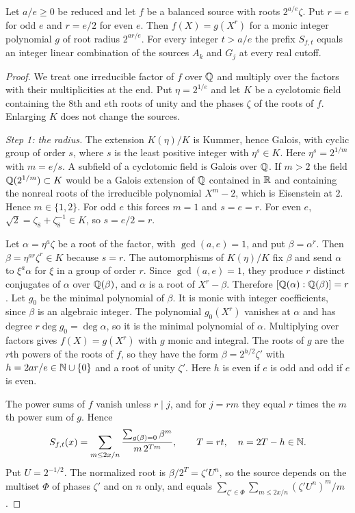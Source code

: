 \documentclass[11pt]{article}
\begin{document}
\begin{theorem}\label{th:balanced}
Let $a/e\ge0$ be reduced and let $f$ be a balanced source with roots $2^{a/e}\zeta$. Put $r=e$ for odd $e$ and $r=e/2$ for even $e$. Then $f(X)=g(X^r)$ for a monic integer polynomial $g$ of root radius $2^{ar/e}$. For every integer $t>a/e$ the prefix $S_{f,t}$ equals an integer linear combination of the sources $A_k$ and $G_j$ at every real cutoff.
\end{theorem}
\begin{proof}
We treat one irreducible factor of $f$ over $\mathbb Q$ and multiply over the factors with their multiplicities at the end. Put $\eta=2^{1/e}$ and let $K$ be a cyclotomic field containing the $8$th and $e$th roots of unity and the phases $\zeta$ of the roots of $f$. Enlarging $K$ does not change the sources.

\emph{Step 1: the radius.} The extension $K(\eta)/K$ is Kummer, hence Galois, with cyclic group of order $s$, where $s$ is the least positive integer with $\eta^s\in K$. Here $\eta^s=2^{1/m}$ with $m=e/s$. A subfield of a cyclotomic field is Galois over $\mathbb Q$. If $m>2$ the field $\mathbb Q(2^{1/m})\subset K$ would be a Galois extension of $\mathbb Q$ contained in $\mathbb R$ and containing the nonreal roots of the irreducible polynomial $X^m-2$, which is Eisenstein at $2$. Hence $m\in\{1,2\}$. For odd $e$ this forces $m=1$ and $s=e=r$. For even $e$, $\sqrt2=\zeta_8+\zeta_8^{-1}\in K$, so $s=e/2=r$.

Let $\alpha=\eta^a\zeta$ be a root of the factor, with $\gcd(a,e)=1$, and put $\beta=\alpha^r$. Then $\beta=\eta^{ar}\zeta^r\in K$ because $s=r$. The automorphisms of $K(\eta)/K$ fix $\beta$ and send $\alpha$ to $\xi^{a}\alpha$ for $\xi$ in a group of order $r$. Since $\gcd(a,e)=1$, they produce $r$ distinct conjugates of $\alpha$ over $\mathbb Q(\beta)$, and $\alpha$ is a root of $X^r-\beta$. Therefore $[\mathbb Q(\alpha):\mathbb Q(\beta)]=r$. Let $g_0$ be the minimal polynomial of $\beta$. It is monic with integer coefficients, since $\beta$ is an algebraic integer. The polynomial $g_0(X^r)$ vanishes at $\alpha$ and has degree $r\deg g_0=\deg\alpha$, so it is the minimal polynomial of $\alpha$. Multiplying over factors gives $f(X)=g(X^r)$ with $g$ monic and integral. The roots of $g$ are the $r$th powers of the roots of $f$, so they have the form $\beta=2^{h/2}\zeta'$ with $h=2ar/e\in\mathbb N\cup\{0\}$ and a root of unity $\zeta'$. Here $h$ is even if $e$ is odd and odd if $e$ is even.

The power sums of $f$ vanish unless $r\mid j$, and for $j=rm$ they equal $r$ times the $m$th power sum of $g$. Hence
\[
 S_{f,t}(x)=\sum_{m\le 2x/n}\frac{\sum_{g(\beta)=0}\beta^m}{m\,2^{Tm}},\qquad T=rt,\quad n=2T-h\in\mathbb N .
\]
Put $U=2^{-1/2}$. The normalized root is $\beta/2^T=\zeta'U^{n}$, so the source depends on the multiset $\Phi$ of phases $\zeta'$ and on $n$ only, and equals $\sum_{\zeta'\in\Phi}\sum_{m\le 2x/n}(\zeta'U^n)^m/m$.


\end{proof}
\end{document}

